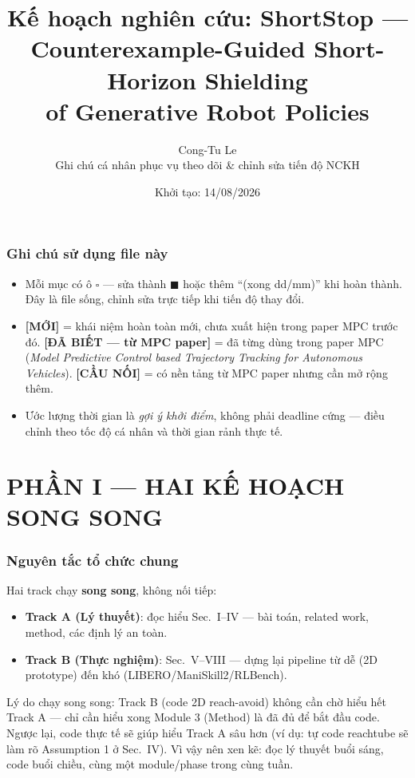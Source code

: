 \documentclass[a4paper,12pt]{article}
\title{\textbf{Kế hoạch nghiên cứu: ShortStop --- \\ Counterexample-Guided Short-Horizon Shielding \\ of Generative Robot Policies}}
\author{Cong-Tu Le \\ \small Ghi chú cá nhân phục vụ theo dõi \& chỉnh sửa tiến độ NCKH}
\date{Khởi tạo: 14/08/2026}
\let\stdsection\section
\renewcommand{\section}{\clearpage\stdsection}
\newcommand{\new}{\textcolor{red!60!black}{\textbf{[MỚI]}}}
\newcommand{\known}{\textcolor{green!40!black}{\textbf{[ĐÃ BIẾT --- từ MPC paper]}}}
\newcommand{\bridge}{\textcolor{blue!50!black}{\textbf{[CẦU NỐI]}}}
\begin{document}
\maketitle
\tableofcontents

\section*{Ghi chú sử dụng file này}
\begin{itemize}
  \item Mỗi mục có ô $\square$ — sửa thành $\blacksquare$ hoặc thêm ``(xong dd/mm)'' khi hoàn thành. Đây là file sống, chỉnh sửa trực tiếp khi tiến độ thay đổi.
  \item \new{} = khái niệm hoàn toàn mới, chưa xuất hiện trong paper MPC trước đó. \known{} = đã từng dùng trong paper MPC (\emph{Model Predictive Control based Trajectory Tracking for Autonomous Vehicles}). \bridge{} = có nền tảng từ MPC paper nhưng cần mở rộng thêm.
  \item Ước lượng thời gian là \emph{gợi ý khởi điểm}, không phải deadline cứng — điều chỉnh theo tốc độ cá nhân và thời gian rảnh thực tế.
\end{itemize}

\part*{PHẦN I --- HAI KẾ HOẠCH SONG SONG}

\section{Nguyên tắc tổ chức chung}
Hai track chạy \textbf{song song}, không nối tiếp:
\begin{itemize}
  \item \textbf{Track A (Lý thuyết)}: đọc hiểu Sec.~I--IV — bài toán, related work, method, các định lý an toàn.
  \item \textbf{Track B (Thực nghiệm)}: Sec.~V--VIII — dựng lại pipeline từ dễ (2D prototype) đến khó (LIBERO/ManiSkill2/RLBench).
\end{itemize}
Lý do chạy song song: Track B (code 2D reach-avoid) không cần chờ hiểu hết Track A — chỉ cần hiểu xong Module 3 (Method) là đã đủ để bắt đầu code. Ngược lại, code thực tế sẽ giúp hiểu Track A sâu hơn (ví dụ: tự code reachtube sẽ làm rõ Assumption 1 ở Sec.~IV). Vì vậy nên xen kẽ: đọc lý thuyết buổi sáng, code buổi chiều, cùng một module/phase trong cùng tuần.
\end{document}
